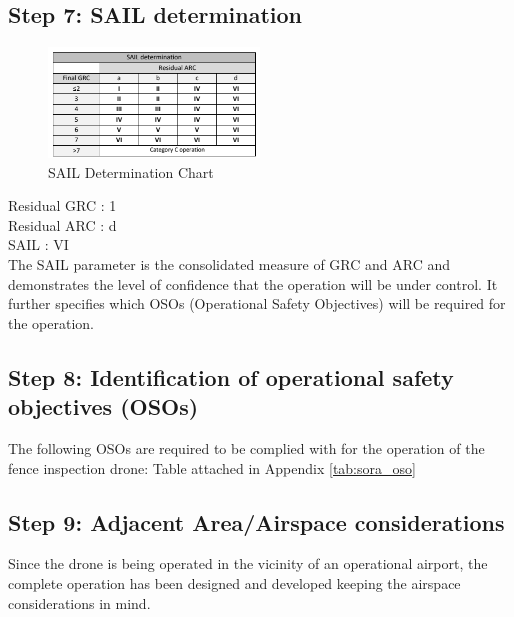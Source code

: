\documentclass[../Head/Main.tex]{subfiles}
\begin{document}
\subsection{Step 7: SAIL determination}
\begin{figure}[H]
    \centering
    \includegraphics[width = 0.5\textwidth]{../Figures/sail.png}
    \caption{SAIL Determination Chart}
    \label{fig:sora_sail}
\end{figure}
Residual GRC : 1 \\
Residual ARC : d \\
SAIL : VI \\

The SAIL parameter is the consolidated measure of GRC and ARC  and demonstrates the level of confidence that the operation will be under control. It further specifies which OSOs (Operational Safety Objectives) will be required for the operation.

\subsection{Step 8: Identification of operational safety objectives (OSOs)}
The following OSOs are required to be complied with for the operation of the fence inspection drone:
Table attached in Appendix \ref{tab:sora_oso}

\subsection{Step 9: Adjacent Area/Airspace considerations}
Since the drone is being operated in the vicinity of an operational airport, the complete operation has been designed and developed keeping the airspace considerations in mind.
\end{document}

